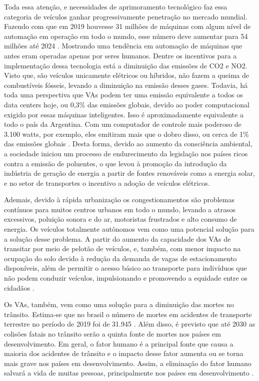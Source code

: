 \documentclass[
	12pt,				%
	openany, %
	a4paper,			%
	english,			%
	french,				%
	spanish,			%
	brazil				%
	]{abntex2}
\begin{document}
Toda essa atenção, e necessidades de aprimoramento tecnológico faz essa categoria de veículos ganhar progressivamente penetração no mercado mundial. Fazendo com que em 2019 houvesse 31 milhões de máquinas com algum nível de automação em operação em todo o mundo, esse número deve aumentar para 54 milhões até 2024 \cite{sensors}. Mostrando uma tendência em automação de máquinas que antes eram operadas apenas por seres humanos.
Dentre os incentivos para a implementação dessa tecnologia está a diminuição das emissões de CO2 e NO2. Visto que, são veículos unicamente elétricos ou híbridos, não fazem a queima de combustíveis fósseis, levando a diminuição na emissão desses gases. Todavia, há toda uma perspectiva que VAs podem ter uma emissão equivalente a todos os data centers hoje, ou 0,3\% das emissões globais, devido ao poder computacional exigido por essas máquinas inteligentes. Isso é aproximadamente equivalente a todo o país da Argentina. Com um computador de controle mais poderoso de 3.100 watts, por exemplo, eles emitiram mais que o dobro disso, ou cerca de 1\% das emissões globais \cite{intro-pm}.
Desta forma, devido ao aumento da consciência ambiental, a sociedade iniciou um processo de endurecimento da legislação nos países ricos contra a emissão de poluentes, o que levou à promoção da introdução da indústria de geração de energia a partir de fontes renováveis como a energia solar, e no setor de transportes o incentivo a adoção de veículos elétricos.

Ademais, devido à rápida urbanização os congestionamentos são problemas contínuos para muitos centros urbanos em todo o mundo, levando a atrasos excessivos, poluição sonora e do ar, motoristas frustrados e alto consumo de energia. Os veículos totalmente autônomos vem como uma potencial solução para a solução desse problema. A partir do aumento da capacidade dos VAs de transitar por meio de pelotão de veículos, e, também, com menor impacto na ocupação do solo devido à redução da demanda de vagas de estacionamento disponíveis, além de permitir o acesso básico ao transporte para indivíduos que não podem conduzir veículos, impulsionando e promovendo a equidade entre os cidadãos \cite{conge}.

Os VAs, também, vem como uma solução para a diminuição das mortes no trânsito. Estima-se que no brasil o número de mortes em acidentes de transporte terrestre no período de 2019 foi de 31.945 \cite{Anexo_I_pnatrans}. Além disso, é previsto que até 2030 as colisões fatais no trânsito serão a quinta fonte de mortes nos países em desenvolvimento. Em geral, o fator humano é a principal fonte que causa a maioria dos acidentes de trânsito e o impacto desse fator aumenta ou se torna mais grave nos países em desenvolvimento. Assim, a eliminação do fator humano salvará a vida de muitas pessoas, principalmente nos países em desenvolvimento \cite{mundobrasil}. 
\end{document}
